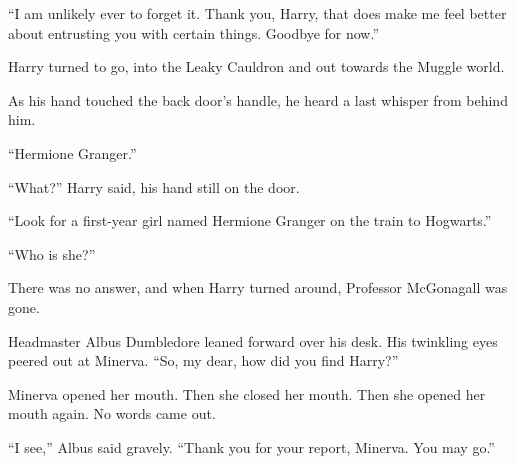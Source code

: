 “I am unlikely ever to forget it. Thank you, Harry, that does make me feel better about entrusting you with certain things. Goodbye for now.”

Harry turned to go, into the Leaky Cauldron and out towards the Muggle world.

As his hand touched the back door’s handle, he heard a last whisper from behind him.

“Hermione Granger.”

“What?” Harry said, his hand still on the door.

“Look for a first-year girl named Hermione Granger on the train to Hogwarts.”

“Who is she?”

There was no answer, and when Harry turned around, Professor McGonagall was gone.


Headmaster Albus Dumbledore leaned forward over his desk. His twinkling eyes peered out at Minerva. “So, my dear, how did you find Harry?”

Minerva opened her mouth. Then she closed her mouth. Then she opened her mouth again. No words came out.

“I see,” Albus said gravely. “Thank you for your report, Minerva. You may go.”

